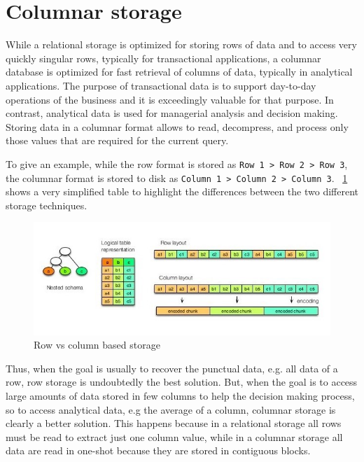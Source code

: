 \documentclass[10pt, a4paper]{report}
\begin{document}
\section{Columnar storage}

While a relational storage is optimized for storing rows of data and to access very quickly singular rows, typically for transactional applications, a columnar database is optimized for fast retrieval of columns of data, typically in analytical applications. The purpose of transactional data is to support day-to-day operations of the business and it is exceedingly valuable for that purpose. In contrast, analytical data is used for managerial analysis and decision making. Storing data in a columnar format allows to read, decompress, and process only those values that are required for the current query.

To give an example, while the row format is stored as \texttt{Row 1 > Row 2 > Row 3}, the columnar format is stored to disk as \texttt{Column 1 > Column 2 > Column 3}.
\figurename~\ref{fig:row_vs_column_storage} shows a very simplified table to highlight the differences between the two different storage techniques.

\begin{figure}
	\centering
	\includegraphics[width=12cm]{./assets/img/row_vs_column.jpg}
	\caption{Row vs column based storage}
	\label{fig:row_vs_column_storage}
	\vspace{0.5cm}
\end{figure}

Thus, when the goal is usually to recover the punctual data, e.g. all data of a row, row storage is undoubtedly the best solution. But, when the goal is to access large amounts of data stored in few columns to help the decision making process, so to access analytical data, e.g the average of a column, columnar storage is clearly a better solution. This happens because in a relational storage all rows must be read to extract just one column value, while in a columnar storage all data are read in one-shot because they are stored in contiguous blocks.
\end{document}
